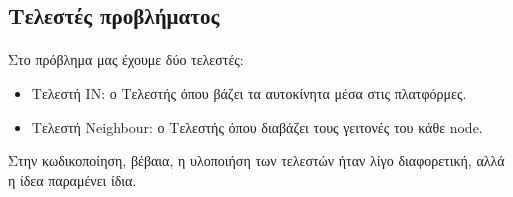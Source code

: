 \documentclass{article}
\begin{document}
    \subsection{Τελεστές προβλήματος}
    \paragraph{}
    Στο πρόβλημα μας έχουμε δύο τελεστές:

    \begin{itemize}
        \item Τελεστή IN: ο Τελεστής όπου βάζει τα αυτοκίνητα μέσα στις πλατφόρμες.
        \item Tελεστή Neighbour: ο Τελεστής όπου διαβάζει τους γειτονές του κάθε node.
    \end{itemize}

    Στην κωδικοποίηση, βέβαια, η υλοποιήση των τελεστών ήταν λίγο διαφορετική, αλλά η ίδεα παραμένει ίδια.
\end{document}
